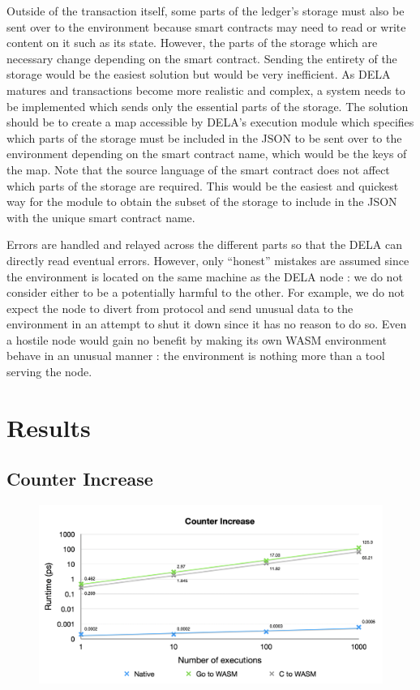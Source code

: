 \documentclass[11pt, a4paper, twoside, openright]{article}
\begin{document}
Outside of the transaction itself, some parts of the ledger's storage must also be sent over to the environment because smart contracts may need to read or write content on it such as its state. However, the parts of the storage which are necessary change depending on the smart contract. Sending the entirety of the storage would be the easiest solution but would be very inefficient. As DELA matures and transactions become more realistic and complex, a system needs to be implemented which sends only the essential parts of the storage. The solution should be to create a map accessible by DELA's execution module which specifies which parts of the storage must be included in the JSON to be sent over to the environment depending on the smart contract name, which would be the keys of the map. Note that the source language of the smart contract does not affect which parts of the storage are required. This would be the easiest and quickest way for the module to obtain the subset of the storage to include in the JSON with the unique smart contract name.

Errors are handled and relayed across the different parts so that the DELA can directly read eventual errors. However, only ``honest'' mistakes are assumed since the environment is located on the same machine as the DELA node : we do not consider either to be a potentially harmful to the other. For example, we do not expect the node to divert from protocol and send unusual data to the environment in an attempt to shut it down since it has no reason to do so. Even a hostile node would gain no benefit by making its own WASM environment behave in an unusual manner : the environment is nothing more than a tool serving the node.

\section{Results}

\subsection{Counter Increase}

\begin{figure}[H]
 \centering
  \includegraphics[width=14cm]{increase_counter.png}
\end{figure}
\end{document}
